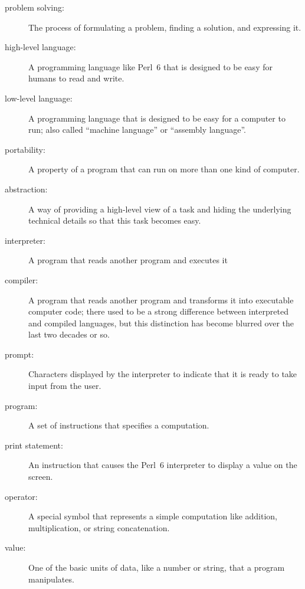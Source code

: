 \begin{description}

\item[problem solving:]  The process of formulating a problem, finding
a solution, and expressing it.

\item[high-level language:]  A programming language like Perl~6 that
is designed to be easy for humans to read and write.

\item[low-level language:]  A programming language that is designed
to be easy for a computer to run; also called ``machine language'' or
``assembly language''.

\item[portability:]  A property of a program that can run on more
than one kind of computer.

\item[abstraction:] A way of providing a high-level view 
of a task and hiding the underlying technical details so 
that this task becomes easy.

\item[interpreter:]  A program that reads another program and executes it

\item[compiler:]  A program that reads another program and 
transforms it into executable computer code; there used to be 
a strong difference between interpreted and compiled languages, 
but this distinction has become blurred over the last 
two decades or so.

\item[prompt:] Characters displayed by the interpreter to indicate
that it is ready to take input from the user.

\item[program:] A set of instructions that specifies a computation.

\item[print statement:]  An instruction that causes the Perl~6
interpreter to display a value on the screen.

\item[operator:]  A special symbol that represents a simple computation like
addition, multiplication, or string concatenation.

\item[value:]  One of the basic units of data, like a number or string, 
that a program manipulates.


\end{description}
